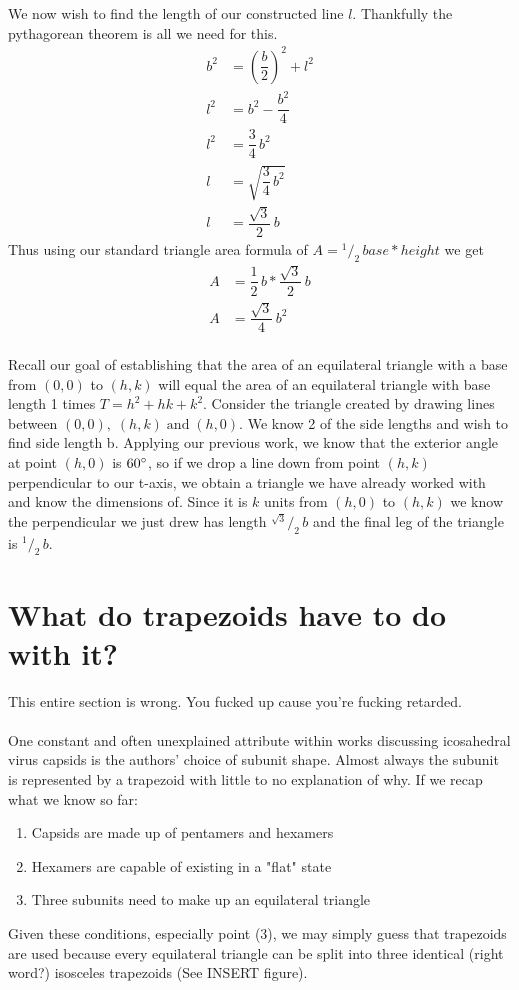 \documentclass[12pt,letter]{article}
\newcommand*\rfrac[2]{{}^{#1}\!/_{#2}}
\begin{document}
We now wish to find the length of our constructed line $l$. Thankfully the pythagorean theorem is all we need for this.
\begin{align*}
b^2 &= \left(\dfrac{b} {2}\right)^2 + l^2 \\
l^2 &= b^2 - \dfrac{b^2} {4} \\
l^2 &= \dfrac{3} {4} \, b^2 \\
l &= \sqrt{\dfrac{3} {4} \, b^2} \\
l &= \dfrac{\sqrt{3}} {2} \, b
\end{align*}
Thus using our standard triangle area formula of $A = \rfrac{1} {2} \, base * height$ we get
\begin{align*}
A &= \dfrac{1} {2} \, b * \dfrac{\sqrt{3}} {2} \, b \\
A &= \dfrac{\sqrt{3}} {4} \, b^2
\end{align*} \\

Recall our goal of establishing that the area of an equilateral triangle with a base from $(0,0)$ to $(h,k)$ will equal the area of an equilateral triangle with base length 1 times $T = h^2 + hk + k^2$. Consider the triangle created by drawing lines between $(0,0), \; (h,k) \; \text{and} \; (h,0)$. We know 2 of the side lengths and wish to find side length b. Applying our previous work, we know that the exterior angle at point $(h,0)$ is $60\degree$, so if we drop a line down from point $(h,k)$ perpendicular to our t-axis, we obtain a triangle we have already worked with and know the dimensions of. Since it is $k$ units from $(h,0)$ to $(h,k)$ we know the perpendicular we just drew has length $\rfrac{\sqrt{3}} {2} \, b$ and the final leg of the triangle is $\rfrac 1 2 \, b$.

\section{What do trapezoids have to do with it?}
This entire section is wrong. You fucked up cause you're fucking retarded.

\paragraph{}
One constant and often unexplained attribute within works discussing icosahedral virus capsids is the authors' choice of subunit shape. Almost always the subunit is represented by a trapezoid with little to no explanation of why. If we recap what we know so far:
\begin{enumerate}
	\item Capsids are made up of pentamers and hexamers
	\item Hexamers are capable of existing in a "flat" state
	\item Three subunits need to make up an equilateral triangle
\end{enumerate}
Given these conditions, especially point (3), we may simply guess that trapezoids are used because every equilateral triangle can be split into three identical (right word?) isosceles trapezoids (See INSERT figure). 
\end{document}
